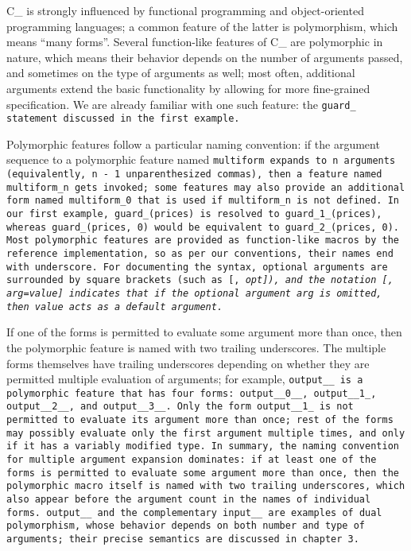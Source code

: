C\_ is strongly influenced by functional programming and
object-oriented programming languages; a common feature of
the latter is polymorphism, which means ``many forms''.
Several function-like features of C\_ are polymorphic in nature,
which means their behavior depends on the number of arguments passed,
and sometimes on the type of arguments as well; most often, additional arguments
extend the basic functionality by allowing for more fine-grained specification.
We are already familiar with one such feature:
the \tt{guard_} statement discussed in the first example.

Polymorphic features follow a particular naming convention:
if the argument sequence to a polymorphic feature named \tt{multiform} expands
to \tt{n} arguments (equivalently, \tt{n - 1} unparenthesized commas),
then a feature named \tt{multiform_n} gets invoked;
some features may also provide an additional form named
\tt{multiform_0} that is used if \tt{multiform_n} is not defined.
In our first example, \tt{guard_(prices)} is resolved to \tt{guard_1_(prices)},
whereas \tt{guard_(prices, 0)} would be equivalent to \tt{guard_2_(prices, 0)}.
Most polymorphic features are provided as function-like macros by the
reference implementation, so as per our conventions, their
names end with underscore.
For documenting the syntax, optional arguments are surrounded by square brackets
(such as [\tt{,} \it{opt}]), and the notation [\tt{,} \it{arg}\tt{=value}]
indicates that if the optional argument \it{arg} is omitted,
then \tt{value} acts as a default argument.

If one of the forms is permitted to evaluate some argument more than once,
then the polymorphic feature is named with two trailing underscores.
The multiple forms themselves have trailing underscores depending
on whether they are permitted multiple evaluation of arguments;
for example, \tt{output__} is a polymorphic feature that has four forms:
\tt{output__0__}, \tt{output__1_}, \tt{output__2__}, and \tt{output__3__}.
Only the form \tt{output__1_} is not permitted to evaluate its argument
more than once; rest of the forms may possibly evaluate only the first
argument multiple times, and only if it has a variably modified type.
In summary, the naming convention for multiple argument expansion dominates:
if at least one of the forms is permitted to evaluate some argument more than
once, then the polymorphic macro itself is named with two trailing underscores,
which also appear before the argument count in the names of individual forms.
\tt{output__} and the complementary \tt{input__} are examples
of dual polymorphism, whose behavior depends on both number and
type of arguments; their precise semantics are discussed in chapter 3.

